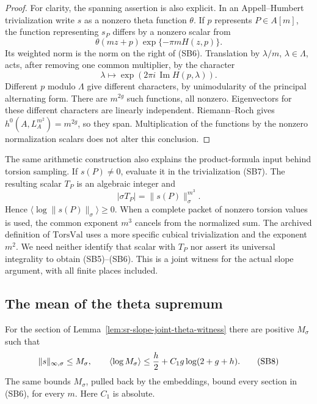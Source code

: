 \begin{proof}
For clarity, the spanning assertion is also
explicit.
In an Appell--Humbert trivialization write
\(s\) as a nonzero theta function \(\theta\).
If \(p\) represents \(P\in A[m]\), the
function representing \(s_P\) differs by a
nonzero scalar from
\[
 \theta(mz+p)\exp\{-\pi m H(z,p)\}.
\]
Its weighted norm is the norm on the right
of (SB6). Translation by \(\lambda/m\),
\(\lambda\in\Lambda\), acts, after removing
one common multiplier, by the character
\[
                \lambda\longmapsto
                         \exp(2\pi i\,\operatorname{Im}H(p,\lambda)).
\]
Different \(p\) modulo \(\Lambda\) give
different characters, by unimodularity
of the principal alternating form.
There are \(m^{2g}\) such functions, all
nonzero.
Eigenvectors for these different characters
are linearly independent.
Riemann--Roch gives
\(h^0(A,L_A^{m^2})=m^{2g}\), so they span.
Multiplication of the functions by the
nonzero normalization scalars does not
alter this conclusion.
\end{proof}

The same arithmetic construction also
explains the product-formula input behind
torsion sampling.
If \(s(P)\ne0\), evaluate it in the
trivialization (SB7).
The resulting scalar \(T_P\) is an algebraic
integer and
\[
             |\sigma T_P|=\|s(P)\|_\sigma^{m^3}.
\]
Hence
\(\langle\log\|s(P)\|_\sigma\rangle\ge0\).
When a complete packet of nonzero torsion
values is used, the common exponent \(m^3\)
cancels from the normalized sum.
The archived definition of \(\mathrm{TorsVal}\)
uses a more specific cubical trivialization
and the exponent \(m^2\).
We need neither identify that scalar with
\(T_P\) nor assert its universal integrality
to obtain (SB5)--(SB6).
This is a joint witness for the actual slope
argument, with all finite places included.

\subsection{The mean of the theta supremum}

\begin{srlemma}\label{lem:sr-slope-theta-mean-sup}
For the section of
Lemma~\ref{lem:sr-slope-joint-theta-witness}
there are positive \(M_\sigma\) such that
\[
 \|s\|_{\infty,\sigma}\le M_\sigma,\qquad
 \langle\log M_\sigma\rangle
        \le {h\over2}+C_1g\log(2+g+h).                \tag{SB8}
\]
The same bounds \(M_\sigma\), pulled back by
the embeddings, bound every section in (SB6),
for every \(m\).
Here \(C_1\) is absolute.
\end{srlemma}

